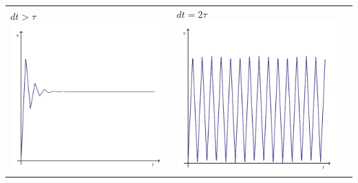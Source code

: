 \documentclass[11pt]{article} %
\begin{document}
\begin{table}[h]
\begin{tabular}{lll}
$dt > \tau$ \includegraphics[scale=0.4]{3.png} & $dt = 2\tau$ \includegraphics[scale=0.4]{4.png} \\

\end{tabular}
\end{table}
\end{document}
